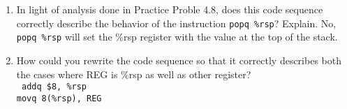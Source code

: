 \documentclass{article}
\begin{document}
\begin{enumerate}[label=\textbf{\Alph*.}]
	\item In light of analysis done in Practice Proble 4.8, does this code sequence
	correctly describe the behavior of the instruction \texttt{popq \%rsp}? Explain.
	No, \texttt{popq \%rsp} will set the \%rsp register with the value at the top of the stack.
	\item How could you rewrite the code sequence so that it correctly describes both the
	cases where REG is \%rsp as well as other register? \\
	\texttt{
		addq \$8, \%rsp \\
		movq 8(\%rsp), REG \\
	}
\end{enumerate}
\end{document}
